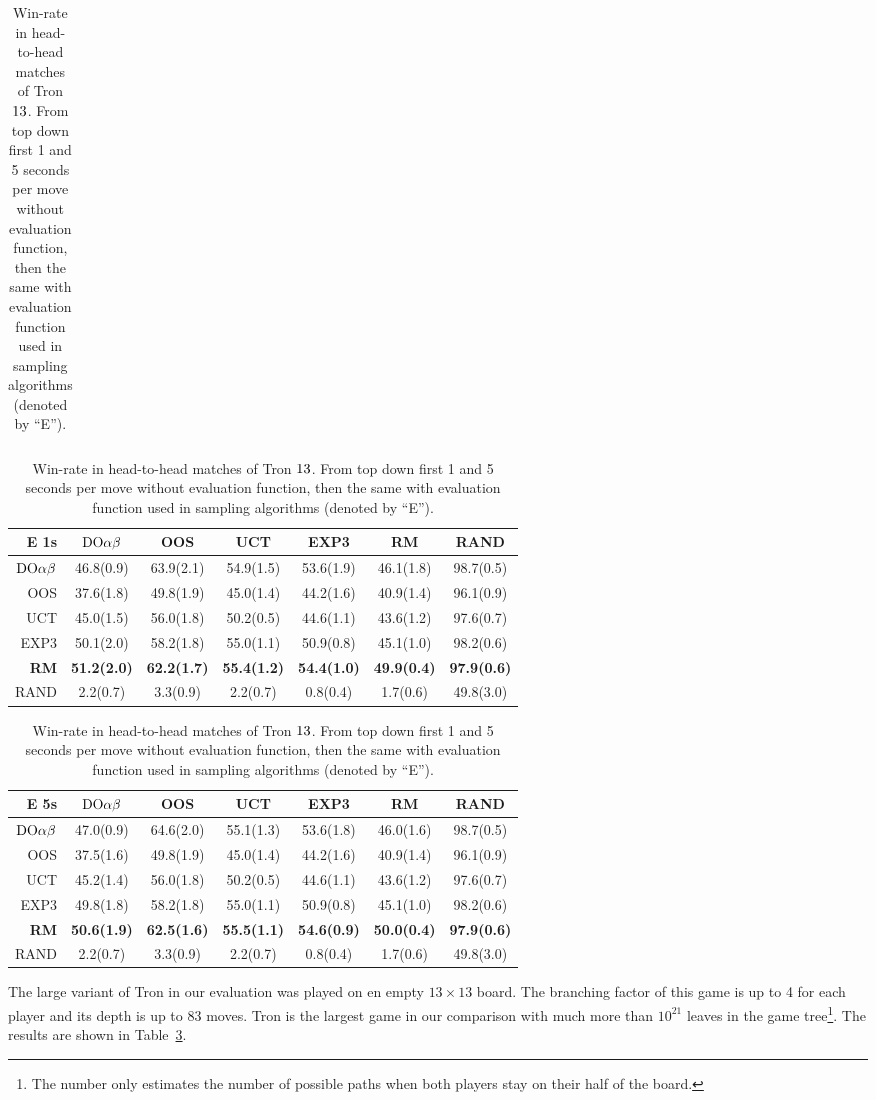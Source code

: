 \begin{table}[t!]
\begin{scriptsize}
\begin{tabular}{|r|cccccc|}
\hline
\end{tabular}
\begin{tabular}{|r|cccccc|}\hline
E 1s&$\textrm{DO}\alpha\beta$&OOS&UCT&EXP3&RM&RAND\\\hline
$\textrm{DO}\alpha\beta$&46.8(0.9)&63.9(2.1)&54.9(1.5)&53.6(1.9)&46.1(1.8)&98.7(0.5)\\
OOS&37.6(1.8)&49.8(1.9)&45.0(1.4)&44.2(1.6)&40.9(1.4)&96.1(0.9)\\
UCT&45.0(1.5)&56.0(1.8)&50.2(0.5)&44.6(1.1)&43.6(1.2)&97.6(0.7)\\
EXP3&50.1(2.0)&58.2(1.8)&55.0(1.1)&50.9(0.8)&45.1(1.0)&98.2(0.6)\\
\textbf{RM}&\textbf{51.2(2.0)}&\textbf{62.2(1.7)}&\textbf{55.4(1.2)}&\textbf{54.4(1.0)}&\textbf{49.9(0.4)}&\textbf{97.9(0.6)}\\
RAND&2.2(0.7)&3.3(0.9)&2.2(0.7)&0.8(0.4)&1.7(0.6)&49.8(3.0)\\
\hline
\end{tabular}
\begin{tabular}{|r|cccccc|}\hline
E 5s&$\textrm{DO}\alpha\beta$&OOS&UCT&EXP3&RM&RAND\\\hline
$\textrm{DO}\alpha\beta$&47.0(0.9)&64.6(2.0)&55.1(1.3)&53.6(1.8)&46.0(1.6)&98.7(0.5)\\
OOS&37.5(1.6)&49.8(1.9)&45.0(1.4)&44.2(1.6)&40.9(1.4)&96.1(0.9)\\
UCT&45.2(1.4)&56.0(1.8)&50.2(0.5)&44.6(1.1)&43.6(1.2)&97.6(0.7)\\
EXP3&49.8(1.8)&58.2(1.8)&55.0(1.1)&50.9(0.8)&45.1(1.0)&98.2(0.6)\\
\textbf{RM}&\textbf{50.6(1.9)}&\textbf{62.5(1.6)}&\textbf{55.5(1.1)}&\textbf{54.6(0.9)}&\textbf{50.0(0.4)}&\textbf{97.9(0.6)}\\
RAND&2.2(0.7)&3.3(0.9)&2.2(0.7)&0.8(0.4)&1.7(0.6)&49.8(3.0)\\


\hline
\end{tabular}

\end{scriptsize}
\caption{Win-rate in head-to-head matches of Tron $13\time 13$. From top down first 1 and 5 seconds per move without evaluation function, then the same with evaluation function used in sampling algorithms (denoted by ``E'').}\label{fig:matches:tron}
\end{table}

The large variant of Tron in our evaluation was played on en empty $13\times 13$ board. The branching factor of this game is up to 4 for each player and its depth is up to 83 moves. Tron is the largest game in our comparison with much more than $10^{21}$ leaves in the game tree\footnote{The number only estimates the number of possible paths when both players stay on their half of the board.}.
The results are shown in Table~\ref{fig:matches:tron}.

